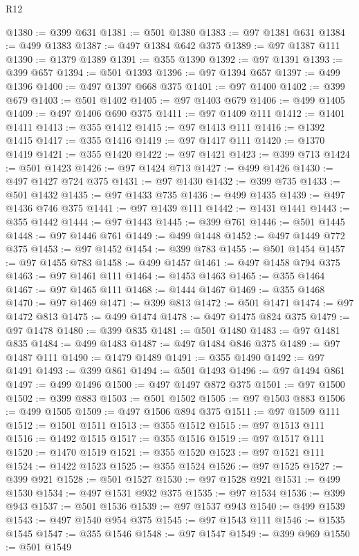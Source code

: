 \begin{lexlean}{R12}
\begin{coremodule}
@1380 := @399 @631
@1381 := @501 @1380
@1383 := @97 @1381 @631
@1384 := @499 @1383
@1387 := @497 @1384 @642 @375
@1389 := @97 @1387 @111
@1390 := @1379 @1389
@1391 := @355 @1390
@1392 := @97 @1391
@1393 := @399 @657
@1394 := @501 @1393
@1396 := @97 @1394 @657
@1397 := @499 @1396
@1400 := @497 @1397 @668 @375
@1401 := @97 @1400
@1402 := @399 @679
@1403 := @501 @1402
@1405 := @97 @1403 @679
@1406 := @499 @1405
@1409 := @497 @1406 @690 @375
@1411 := @97 @1409 @111
@1412 := @1401 @1411
@1413 := @355 @1412
@1415 := @97 @1413 @111
@1416 := @1392 @1415
@1417 := @355 @1416
@1419 := @97 @1417 @111
@1420 := @1370 @1419
@1421 := @355 @1420
@1422 := @97 @1421
@1423 := @399 @713
@1424 := @501 @1423
@1426 := @97 @1424 @713
@1427 := @499 @1426
@1430 := @497 @1427 @724 @375
@1431 := @97 @1430
@1432 := @399 @735
@1433 := @501 @1432
@1435 := @97 @1433 @735
@1436 := @499 @1435
@1439 := @497 @1436 @746 @375
@1441 := @97 @1439 @111
@1442 := @1431 @1441
@1443 := @355 @1442
@1444 := @97 @1443
@1445 := @399 @761
@1446 := @501 @1445
@1448 := @97 @1446 @761
@1449 := @499 @1448
@1452 := @497 @1449 @772 @375
@1453 := @97 @1452
@1454 := @399 @783
@1455 := @501 @1454
@1457 := @97 @1455 @783
@1458 := @499 @1457
@1461 := @497 @1458 @794 @375
@1463 := @97 @1461 @111
@1464 := @1453 @1463
@1465 := @355 @1464
@1467 := @97 @1465 @111
@1468 := @1444 @1467
@1469 := @355 @1468
@1470 := @97 @1469
@1471 := @399 @813
@1472 := @501 @1471
@1474 := @97 @1472 @813
@1475 := @499 @1474
@1478 := @497 @1475 @824 @375
@1479 := @97 @1478
@1480 := @399 @835
@1481 := @501 @1480
@1483 := @97 @1481 @835
@1484 := @499 @1483
@1487 := @497 @1484 @846 @375
@1489 := @97 @1487 @111
@1490 := @1479 @1489
@1491 := @355 @1490
@1492 := @97 @1491
@1493 := @399 @861
@1494 := @501 @1493
@1496 := @97 @1494 @861
@1497 := @499 @1496
@1500 := @497 @1497 @872 @375
@1501 := @97 @1500
@1502 := @399 @883
@1503 := @501 @1502
@1505 := @97 @1503 @883
@1506 := @499 @1505
@1509 := @497 @1506 @894 @375
@1511 := @97 @1509 @111
@1512 := @1501 @1511
@1513 := @355 @1512
@1515 := @97 @1513 @111
@1516 := @1492 @1515
@1517 := @355 @1516
@1519 := @97 @1517 @111
@1520 := @1470 @1519
@1521 := @355 @1520
@1523 := @97 @1521 @111
@1524 := @1422 @1523
@1525 := @355 @1524
@1526 := @97 @1525
@1527 := @399 @921
@1528 := @501 @1527
@1530 := @97 @1528 @921
@1531 := @499 @1530
@1534 := @497 @1531 @932 @375
@1535 := @97 @1534
@1536 := @399 @943
@1537 := @501 @1536
@1539 := @97 @1537 @943
@1540 := @499 @1539
@1543 := @497 @1540 @954 @375
@1545 := @97 @1543 @111
@1546 := @1535 @1545
@1547 := @355 @1546
@1548 := @97 @1547
@1549 := @399 @969
@1550 := @501 @1549

\end{coremodule}
\end{lexlean}

